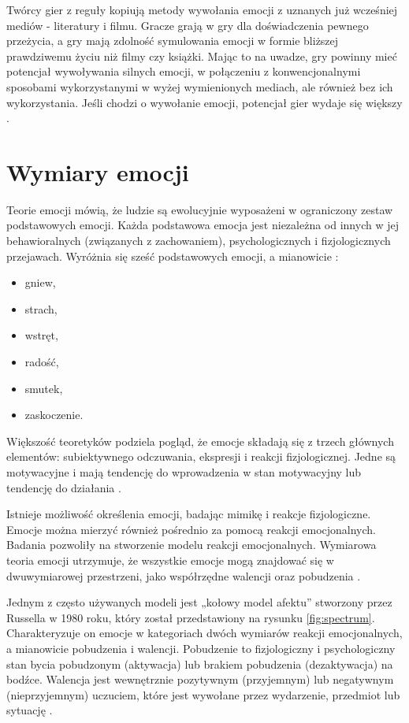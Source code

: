 Twórcy gier z reguły kopiują metody wywołania emocji z uznanych już wcześniej mediów - literatury i filmu. Gracze grają w gry dla doświadczenia pewnego przeżycia, a gry mają zdolność symulowania emocji w formie bliższej prawdziwemu życiu niż filmy czy książki. Mając to na uwadze, gry powinny mieć potencjał wywoływania silnych emocji, w połączeniu z konwencjonalnymi sposobami wykorzystanymi w wyżej wymienionych mediach, ale również bez ich wykorzystania. Jeśli chodzi o wywołanie emocji, potencjał gier wydaje się większy \citep{button, movesus}.

\section{Wymiary emocji}

Teorie emocji mówią, że ludzie są ewolucyjnie wyposażeni w ograniczony zestaw podstawowych emocji. Każda podstawowa emocja jest niezależna od innych w jej behawioralnych (związanych z zachowaniem), psychologicznych i fizjologicznych przejawach. Wyróżnia się sześć podstawowych emocji, a mianowicie \citep{colors}:
\begin{itemize}
  \item gniew,
  \item strach,
  \item wstręt,
  \item radość,
  \item smutek,
  \item zaskoczenie.
\end{itemize}

Większość teoretyków podziela pogląd, że emocje składają się z trzech głównych elementów: subiektywnego odczuwania, ekspresji i reakcji fizjologicznej. Jedne są motywacyjne i mają tendencję do wprowadzenia w stan motywacyjny lub tendencję do działania \citep{games}.

Istnieje możliwość określenia emocji, badając mimikę i reakcje fizjologiczne. Emocje można mierzyć również pośrednio za pomocą reakcji emocjonalnych. Badania pozwoliły na stworzenie modelu reakcji emocjonalnych.  Wymiarowa teoria emocji utrzymuje, że wszystkie emocje mogą znajdować się w dwuwymiarowej przestrzeni, jako współrzędne walencji oraz pobudzenia \citep{games}.

Jednym z często używanych modeli jest „kołowy model afektu” stworzony przez Russella w 1980 roku, który został przedstawiony na rysunku \ref{fig:spectrum}. Charakteryzuje on emocje w kategoriach dwóch wymiarów reakcji emocjonalnych, a mianowicie pobudzenia i walencji. Pobudzenie to fizjologiczny i psychologiczny stan bycia pobudzonym (aktywacja) lub brakiem pobudzenia (dezaktywacja) na bodźce. Walencja jest wewnętrznie pozytywnym (przyjemnym) lub negatywnym (nieprzyjemnym) uczuciem, które jest wywołane przez wydarzenie, przedmiot lub sytuację \citep{colors}.

